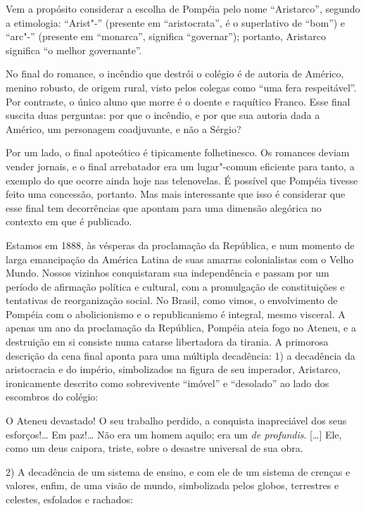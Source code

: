 Vem a propósito considerar a escolha de Pompéia pelo nome ``Aristarco'',
segundo a etimologia: ``Arist"-'' (presente em ``aristocrata'', é o
superlativo de ``bom'') e ``arc"-'' (presente em ``monarca'', significa
``governar''); portanto, Aristarco significa ``o melhor governante''.

No final do romance, o incêndio que destrói o colégio é de autoria de
Américo, menino robusto, de origem rural, visto pelos colegas como ``uma
fera respeitável''. Por contraste, o único aluno que morre é o doente e
raquítico Franco. Esse final suscita duas perguntas: por que o
incêndio, e por que sua autoria dada a Américo, um personagem
coadjuvante, e não a Sérgio?

Por um lado, o final apoteótico é tipicamente folhetinesco. Os romances
deviam vender jornais, e o final arrebatador era um lugar"-comum
eficiente para tanto, a exemplo do que ocorre ainda hoje nas
telenovelas. É possível que Pompéia tivesse feito uma concessão,
portanto. Mas mais interessante que isso é considerar que esse final
tem decorrências que apontam para uma dimensão alegórica no contexto em
que é publicado.

Estamos em 1888, às vésperas da proclamação da
República, e num momento de larga emancipação da América Latina de suas
amarras colonialistas com o Velho Mundo. Nossos vizinhos conquistaram
sua independência e passam por um período de afirmação política e
cultural, com a promulgação de constituições e tentativas de
reorganização social. No Brasil, como vimos, o envolvimento de Pompéia
com o abolicionismo e o republicanismo é integral, mesmo visceral. A
apenas um ano da proclamação da República, Pompéia ateia fogo no
Ateneu, e a destruição em si consiste numa catarse libertadora da
tirania. A primorosa descrição da cena final aponta para uma múltipla
decadência: 1) a decadência da aristocracia e do império, simbolizados
na figura de seu imperador, Aristarco, ironicamente descrito como
sobrevivente ``imóvel'' e ``desolado'' ao lado dos escombros do colégio: 

\begin{hedraquote}
O Ateneu devastado! O seu trabalho perdido, a conquista inapreciável dos
seus esforços!\ldots{} Em paz!\ldots{} Não era um homem aquilo; era um
\textit{de profundis}. [\ldots{}] Ele, como um
deus caipora, triste, sobre o desastre universal de sua obra.
\end{hedraquote}

2) A decadência de um sistema de ensino, e com ele de um sistema de crenças
e valores, enfim, de uma visão de mundo, simbolizada pelos globos,
terrestres e celestes, esfolados e rachados: 

